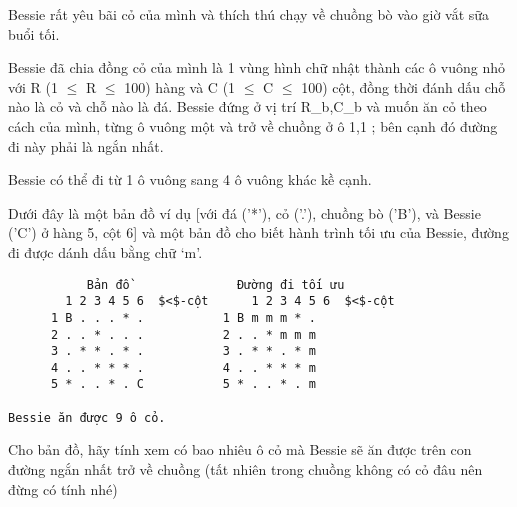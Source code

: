Bessie rất yêu bãi cỏ của mình và thích thú chạy về chuồng bò vào  giờ vắt sữa buổi tối.  

   Bessie đã chia đồng cỏ của mình là 1 vùng hình chữ nhật thành  các ô vuông nhỏ với R (1  $\le$  R  $\le$  100) hàng và C (1  $\le$  C  $\le$  100) cột,  đồng thời đánh dấu chỗ nào là cỏ và chỗ nào là đá. Bessie đứng ở vị  trí R\_b,C\_b và muốn ăn cỏ theo cách của mình, từng ô vuông một và  trở về chuồng ở ô 1,1 ; bên cạnh đó đường đi này phải là ngắn nhất.  

   Bessie có thể đi từ 1 ô vuông sang 4 ô vuông khác kề cạnh.  

   Dưới đây là một bản đồ ví dụ [với đá ('*'), cỏ ('.'),  chuồng bò ('B'),  và Bessie ('C') ở hàng 5, cột 6] và một bản đồ cho biết hành trình  tối ưu của Bessie, đường đi được dánh dấu bằng chữ ‘m’.  
\begin{verbatim}
           Bản đồ               Đường đi tối ưu
        1 2 3 4 5 6  $<$-cột      1 2 3 4 5 6  $<$-cột
      1 B . . . * .           1 B m m m * .
      2 . . * . . .           2 . . * m m m
      3 . * * . * .           3 . * * . * m
      4 . . * * * .           4 . . * * * m
      5 * . . * . C           5 * . . * . m

Bessie ăn được 9 ô cỏ.
\end{verbatim}

   Cho bản đồ, hãy tính xem có bao nhiêu ô cỏ mà Bessie sẽ ăn được trên  con đường ngắn nhất trở về chuồng (tất nhiên trong chuồng không có  cỏ đâu nên đừng có tính nhé)  

\